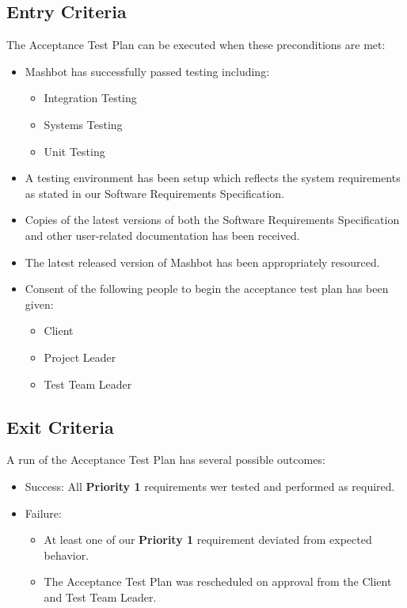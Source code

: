 \documentclass{article}
\begin{document}
\subsection{Entry Criteria}
	The Acceptance Test Plan can be executed when these preconditions are met:
	\begin{itemize}
		\item Mashbot has successfully passed testing including:
			\begin{itemize}
				\item Integration Testing
				\item Systems Testing
				\item Unit Testing
			\end{itemize}
		\item A testing environment has been setup which reflects the system 
		requirements as stated in our Software Requirements Specification.
		\item Copies of the latest versions of both the Software Requirements 
		Specification and other user-related documentation has been received.
		\item The latest released version of Mashbot has been appropriately 
		resourced.
		\item Consent of the following people to begin the acceptance test plan 
		has been given:
			\begin{itemize}
				\item Client
				\item Project Leader
				\item Test Team Leader
			\end{itemize}
	\end{itemize}
\subsection{Exit Criteria}
	A run of the Acceptance Test Plan has several possible outcomes:
	\begin{itemize}
		\item Success: All \textbf{Priority 1} requirements wer tested and 
		performed as required.
		\item Failure:
			\begin{itemize}
				\item At least one of our \textbf{Priority 1} requirement 
				deviated from expected behavior.
				\item The Acceptance Test Plan was rescheduled on approval from 
				the Client and Test Team Leader.
			\end{itemize}
		
	\end{itemize}
	
\end{document}
